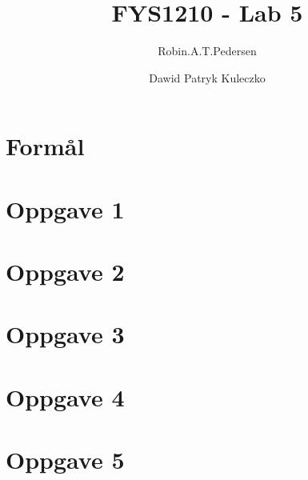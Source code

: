 \documentclass{article}
\begin{document}
\title{FYS1210 - Lab 5}
\author{Robin.A.T.Pedersen \and Dawid Patryk Kuleczko}
\maketitle

\section{Formål}


\section{Oppgave 1}


\section{Oppgave 2}


\section{Oppgave 3}


\section{Oppgave 4}


\section{Oppgave 5}

\end{document}
